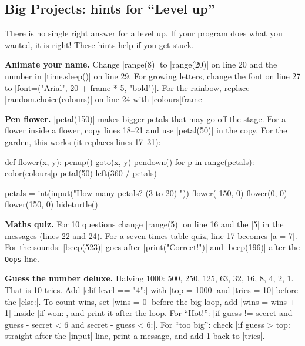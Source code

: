 
\subsection*{Big Projects: hints for ``Level up''}
There is no single right answer for a level up. If your program does what you wanted, it is right! These hints help if you get stuck.

\textbf{Animate your name.} Change \py|range(8)| to \py|range(20)| on line 20 and the number in \py|time.sleep()| on line 29. For growing letters, change the font on line 27 to \py|font=("Arial", 20 + frame * 5, "bold")|. For the rainbow, replace \py|random.choice(colours)| on line 24 with \py|colours[frame %

\textbf{Pen flower.} \py|petal(150)| makes bigger petals that may go off the stage. For a flower inside a flower, copy lines 18--21 and use \py|petal(50)| in the copy. For the garden, this works (it replaces lines 17--31):
\begin{codenonum}
def flower(x, y):
    penup()
    goto(x, y)
    pendown()
    for p in range(petals):
        color(colours[p %
        petal(50)
        left(360 / petals)

petals = int(input("How many petals? (3 to 20) "))
flower(-150, 0)
flower(0, 0)
flower(150, 0)
hideturtle()
\end{codenonum}

\textbf{Maths quiz.} For 10 questions change \py|range(5)| on line 16 and the \py|5| in the messages (lines 22 and 24). For a seven-times-table quiz, line 17 becomes \py|a = 7|. For the sounds: \py|beep(523)| goes after \py|print("Correct!")| and \py|beep(196)| after the \texttt{Oops} line.

\textbf{Guess the number deluxe.} Halving 1000: 500, 250, 125, 63, 32, 16, 8, 4, 2, 1. That is 10 tries. Add \py|elif level == "4":| with \py|top = 1000| and \py|tries = 10| before the \py|else:|. To count wins, set \py|wins = 0| before the big loop, add \py|wins = wins + 1| inside \py|if won:|, and print it after the loop. For ``Hot!'': \py|if guess != secret and guess - secret < 6 and secret - guess < 6:|. For ``too big'': check \py|if guess > top:| straight after the \py|input| line, print a message, and add 1 back to \py|tries|.

